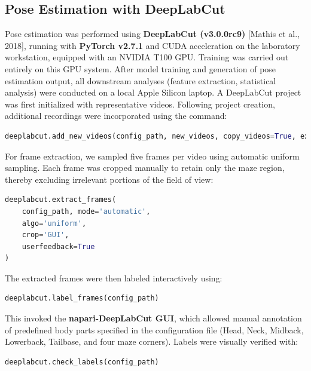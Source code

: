 \subsection{Pose Estimation with DeepLabCut}
Pose estimation was performed using \textbf{DeepLabCut (v3.0.0rc9)} [Mathis et al., 2018], running with \textbf{PyTorch v2.7.1} and CUDA acceleration on the laboratory workstation, equipped with an NVIDIA T100 GPU. Training was carried out entirely on this GPU system. After model training and generation of pose estimation output, all downstream analyses (feature extraction, statistical analysis) were conducted on a local Apple Silicon laptop. A DeepLabCut project was first initialized with representative videos. Following project creation, additional recordings were incorporated using the command:
\begin{lstlisting}[language=Python]
deeplabcut.add_new_videos(config_path, new_videos, copy_videos=True, extract_frames=False)
\end{lstlisting}
For frame extraction, we sampled five frames per video using automatic uniform sampling. Each frame was cropped manually to retain only the maze region, thereby excluding irrelevant portions of the field of view:
\begin{lstlisting}[language=Python]
deeplabcut.extract_frames(
    config_path, mode='automatic',
    algo='uniform',
    crop='GUI',
    userfeedback=True
)
\end{lstlisting}
The extracted frames were then labeled interactively using:
\begin{lstlisting}[language=Python]
deeplabcut.label_frames(config_path)
\end{lstlisting}
This invoked the \textbf{napari-DeepLabCut GUI}, which allowed manual annotation of predefined body parts specified in the configuration file (Head, Neck, Midback, Lowerback, Tailbase, and four maze corners). Labels were visually verified with:
\begin{lstlisting}[language=Python]
deeplabcut.check_labels(config_path)
\end{lstlisting}
